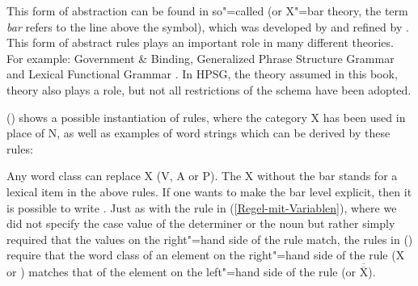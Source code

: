 This form of abstraction can be found in so"=called \xbart (or X"=bar theory, the term \emph{bar}
refers to the line above the symbol), which was developed by \citet{Chomsky70a} and refined by
\citet{Jackendoff77a}. This form of abstract rules plays an important role in many different
theories. For example: Government \& Binding\indexgb \citep{Chomsky81a}, Generalized Phrase
Structure Grammar\indexgpsg \citep{GKPS85a,Uszkoreit87a} and Lexical Functional Grammar\indexlfg
\citep{Bresnan82a-ed,BATW2016a}. In HPSG\indexhpsg, the theory assumed in this book, \xbar theory also plays
a role, but not all restrictions of the \xbar schema have been adopted.

\largerpage
() shows a possible instantiation of \xbar rules, where the category X has been used in place of N, as well as examples of word strings
which can be derived by these rules:
\eanoraggedright
\label{psg-xbar-schema}
\z

\noindent
Any word class can replace X (\eg V, A or P). The X without the bar stands for a lexical item in
the above rules. If one wants to make the bar level explicit, then it is possible to write \xnull. 
Just as with the rule in (\ref{Regel-mit-Variablen}), where we did not specify the case value of the
determiner or the noun but rather simply required that the values on the right"=hand side of the
rule match, the rules in () require that the word class of an element on the right"=hand side
of the rule (X or \xbar) matches that of the element on the left"=hand side of the rule (\xbar or
$\overline{\overline{\mbox{X}}}$).

